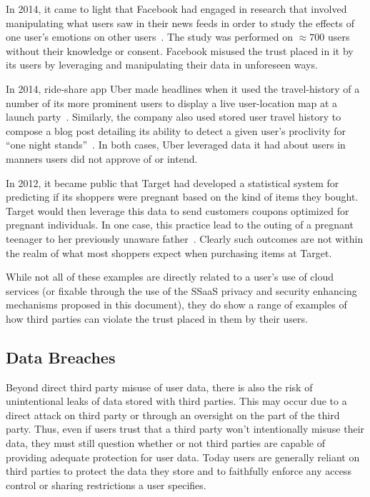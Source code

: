 \begin{packed_desc}
\item[Facebook Emotional Contagion Study:] In 2014, it came to light
  that Facebook had engaged in research that involved manipulating
  what users saw in their news feeds in order to study the effects of
  one user's emotions on other users~\cite{goel2014}. The study was
  performed on $\approx700$ users without their knowledge or
  consent. Facebook misused the trust placed in it by its users by
  leveraging and manipulating their data in unforeseen ways.
\item[Uber User Travel History:] In 2014, ride-share app Uber made
  headlines when it used the travel-history of a number of its more
  prominent users to display a live user-location map at a launch
  party~\cite{sims2014}. Similarly, the company also used stored user
  travel history to compose a blog post detailing its ability to
  detect a given user's proclivity for ``one night
  stands''~\cite{pagliery2014}. In both cases, Uber leveraged data it
  had about users in manners users did not approve of or intend.
\item[Target Pregnancy Prediction:] In 2012, it became public that
  Target had developed a statistical system for predicting if its
  shoppers were pregnant based on the kind of items they
  bought. Target would then leverage this data to send customers
  coupons optimized for pregnant individuals. In one case, this
  practice lead to the outing of a pregnant teenager to her previously
  unaware father~\cite{hill2012}. Clearly such outcomes are not within
  the realm of what most shoppers expect when purchasing items at
  Target.
\end{packed_desc}

While not all of these examples are directly related to a user's use
of cloud services (or fixable through the use of the SSaaS privacy and
security enhancing mechanisms proposed in this document), they do show
a range of examples of how third parties can violate the trust placed
in them by their users.

\subsection{Data Breaches}

Beyond direct third party misuse of user data, there is also the risk
of unintentional leaks of data stored with third parties. This may
occur due to a direct attack on third party or through an oversight on
the part of the third party. Thus, even if users trust that a third
party won't intentionally misuse their data, they must still question
whether or not third parties are capable of providing adequate
protection for user data. Today users are generally reliant on third
parties to protect the data they store and to faithfully enforce any
access control or sharing restrictions a user specifies.

